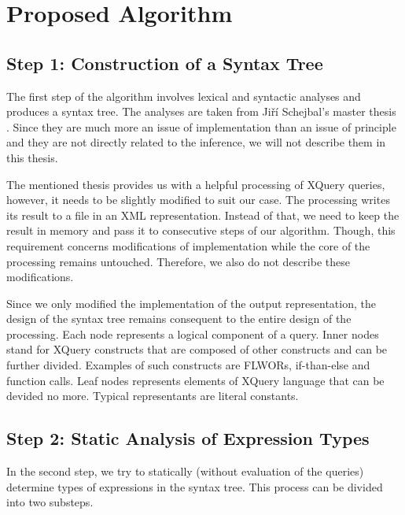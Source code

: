 \chapter{Proposed Algorithm}

\section{Step 1: Construction of a Syntax Tree}
The first step of the algorithm involves lexical and syntactic analyses and produces a syntax tree. The analyses are taken from Ji\v r\'{i} Schejbal's master thesis . Since they are much more an issue of implementation than an issue of principle and they are not directly related to the inference, we will not describe them in this thesis.

The mentioned thesis provides us with a helpful processing of XQuery queries, however, it needs to be slightly modified to suit our case. The processing writes its result to a file in an XML representation. Instead of that, we need to keep the result in memory and pass it to consecutive steps of our algorithm. Though, this requirement concerns modifications of implementation while the core of the processing remains untouched. Therefore, we also do not describe these modifications.

Since we only modified the implementation of the output representation, the design of the syntax tree remains consequent to the entire design of the processing. Each node represents a logical component of a query. Inner nodes stand for XQuery constructs that are composed of other constructs and can be further divided. Examples of such constructs are FLWORs, if-than-else and function calls. Leaf nodes represents elements of XQuery language that can be devided no more. Typical representants are literal constants. 


\section{Step 2: Static Analysis of Expression Types}
In the second step, we try to statically (without evaluation of the queries) determine types of expressions in the syntax tree. This process can be divided into two substeps.

